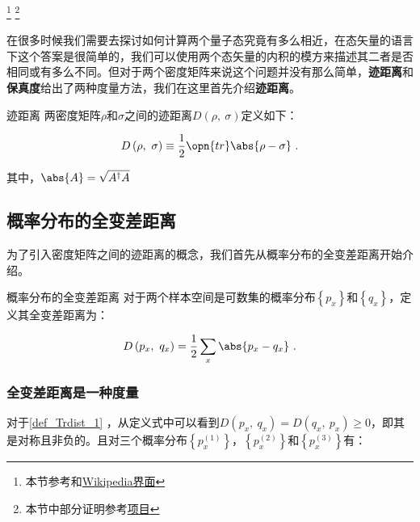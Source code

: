 


\footnote{本节参考\cite{量子信息}和\href{https://en.wikipedia.org/wiki/Trace_distance}{Wikipedia界面}}
\footnote{本节中部分证明参考\href{https://github.com/goropikari/SolutionQCQINielsenChuang}{项目}}


在很多时候我们需要去探讨如何计算两个量子态究竟有多么相近，在态矢量的语言下这个答案是很简单的，我们可以使用两个态矢量的内积的模方来描述其二者是否相同或有多么不同。但对于两个密度矩阵来说这个问题并没有那么简单，\textbf{迹距离}和\textbf{保真度}给出了两种度量方法，我们在这里首先介绍\textbf{迹距离}。

\begin{definition}{迹距离}\label{def_Trdist_1}
两密度矩阵$\rho$和$\sigma$之间的迹距离$D\left(\rho,~\sigma\right)$定义如下：

\begin{equation}
D\left(\rho,~\sigma\right) \equiv \frac{1}{2} \opn{tr}\abs{\rho - \sigma}~.
\end{equation}

其中，$\abs{A} = \sqrt{A^\dagger A}$

\end{definition}

\subsection{概率分布的全变差距离}

为了引入密度矩阵之间的迹距离的概念，我们首先从概率分布的全变差距离开始介绍。

\begin{definition}{概率分布的全变差距离}
对于两个样本空间是可数集的概率分布$\left\{ p_x \right\}$和$\left\{q_x\right\}$，定义其全变差距离为：

\begin{equation}\label{eq_Trdist_1}
D\left( p_x,~q_x \right) = \frac{1}{2}\sum_x\abs{p_x - q_x}~.
\end{equation}

\end{definition}

\subsubsection{全变差距离是一种度量}

对于\autoref{def_Trdist_1} ，从定义式中可以看到$D\left(p_x,~q_x\right) = D\left(q_x,~p_x\right)\geqslant 0$，即其是对称且非负的。且对三个概率分布$\left\{p_x^{(1)}\right\}$，$\left\{p_x^{(2)}\right\}$和$\left\{p_x^{(3)}\right\}$有：

